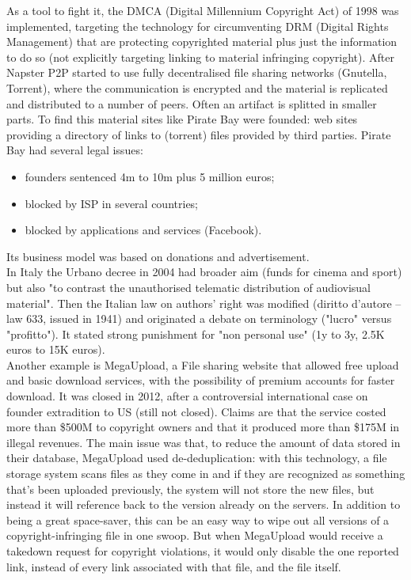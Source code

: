 \documentclass[a4paper, 10pt, titlepage]{article}
\begin{document}
As a tool to fight it, the DMCA (Digital Millennium Copyright Act) of 1998 was implemented, targeting the technology for circumventing DRM
(Digital Rights Management) that are protecting copyrighted material plus just the information to do so (not explicitly targeting linking to material infringing copyright). After Napster P2P started to use fully decentralised file sharing networks (Gnutella, Torrent), where the communication is encrypted and the material is replicated and distributed to a number of peers. Often an artifact is splitted in smaller parts. To find this material sites like Pirate Bay were founded: web sites providing a directory of links to (torrent) files provided by third parties. Pirate Bay had several legal issues:
\begin{itemize}
\item founders sentenced 4m to 10m plus 5 million euros;
\item blocked by ISP in several countries;
\item blocked by applications and services (Facebook).
\end{itemize}
Its business model was based on donations and advertisement. \medskip\\
In Italy the Urbano decree in 2004 had broader aim (funds for cinema and sport) but also "to contrast the unauthorised telematic distribution of audiovisual material". Then the Italian law on authors' right was modified (diritto d'autore – law 633, issued in 1941) and originated a debate on terminology ("lucro" versus "profitto"). It stated strong punishment for "non personal use" (1y to 3y, 2.5K euros to 15K euros). \medskip\\
Another example is MegaUpload, a File sharing website that allowed free upload and basic download services, with the possibility of premium accounts for faster download. It was closed in 2012, after a controversial international case on founder extradition to US (still not closed). Claims are that the service costed more than \$500M to copyright owners and that it produced more than \$175M in illegal revenues. The main issue was that, to reduce the amount of data stored in their database, MegaUpload used de-deduplication: with this technology, a file storage system scans files as they come in and if they are recognized as something that's been uploaded previously, the system will not store the new files, but instead it will reference back to the version already on the servers. In addition to being a great space-saver, this can be an easy way to wipe out all versions of a copyright-infringing file in one swoop. But when MegaUpload would receive a takedown request for copyright violations, it would only disable the one reported link, instead of every link associated with that file, and the file itself. \medskip\\
\end{document}

